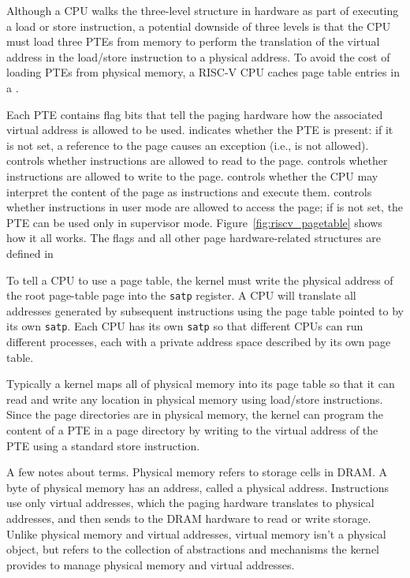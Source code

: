 Although a CPU walks the three-level structure in hardware as part of
executing a load or store instruction, a potential downside of three
levels is that the CPU must load three PTEs from memory to perform the
translation of the virtual address in the load/store instruction to a
physical address.  To avoid the cost of loading PTEs from physical
memory, a RISC-V CPU caches page table entries in a
.

Each PTE contains flag bits that tell the paging hardware
how the associated virtual address is allowed to be used.
indicates whether the PTE is present: if it is
not set, a reference to the page causes an exception (i.e., is not allowed).
controls whether instructions are allowed to 
read to the page.
controls whether instructions are allowed to 
write to the page.
controls whether the CPU may interpret the content
of the page as instructions and execute them.
controls whether instructions in user mode are allowed
to access the page;
if  is not set, the PTE can be used only in supervisor mode.
Figure~\ref{fig:riscv_pagetable}
shows how it all works.
The flags and all other page hardware-related structures are defined in

To tell a CPU to use a page table, the kernel must
write the physical address of the root page-table page into the 
\texttt{satp} register.
A CPU will translate all addresses generated by subsequent instructions
using the page table pointed to by its own \texttt{satp}.
Each CPU has its own \texttt{satp} so that different CPUs can run
different processes, each with a private address space described by
its own page table.

Typically a kernel maps all of physical memory into its page table so
that it can read and write any location in physical memory using
load/store instructions.  Since the page directories are in physical
memory, the kernel can program the content of a PTE in a page
directory by writing to the virtual address of the PTE using a
standard store instruction.

A few notes about terms.
Physical memory refers to storage cells in DRAM.
A byte of physical memory has an address, called a physical address.
Instructions use only virtual addresses, which the
paging hardware translates to physical addresses, and then
sends to the DRAM hardware to read or write storage.
Unlike physical memory and virtual addresses, virtual memory isn't a physical object, but refers to the collection of abstractions and mechanisms
the kernel provides to manage physical memory and virtual
addresses.

